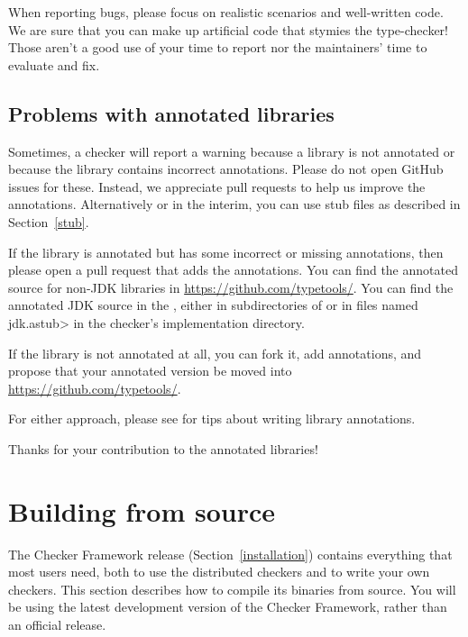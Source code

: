 When reporting bugs, please focus on realistic scenarios and well-written
code.  We are sure that you can make up artificial code that stymies the
type-checker!  Those aren't a good use of your time to report nor the
maintainers' time to evaluate and fix.


\subsection{Problems with annotated libraries\label{reporting-bugs-annotated-libraries}}

Sometimes, a checker will report a warning because a library is not
annotated or because the library contains incorrect annotations.
Please do not open GitHub issues for these.
Instead, we appreciate pull requests to help us improve the annotations.
Alternatively or in the interim, you can use stub files as described in
Section~\ref{stub}.

If the library is annotated but has some incorrect or missing annotations,
then please open a pull request that adds the annotations.
You can find the annotated source for non-JDK libraries in
\url{https://github.com/typetools/}.
You can find the annotated JDK source in the
, either in subdirectories of
or in files named \<jdk.astub> in the checker's implementation directory.

If the library is not annotated at all, you can fork it, add annotations,
and propose that your annotated version be moved into
\url{https://github.com/typetools/}.

For either approach, please see  for
tips about writing library annotations.

Thanks for your contribution to the annotated libraries!


\section{Building from source\label{build-source}}

The Checker Framework release (Section~\ref{installation}) contains
everything that most users need, both to use the distributed checkers and
to write your own checkers.  This section describes how to compile its
binaries from source.  You will be using the latest development version of
the Checker Framework, rather than an official release.

